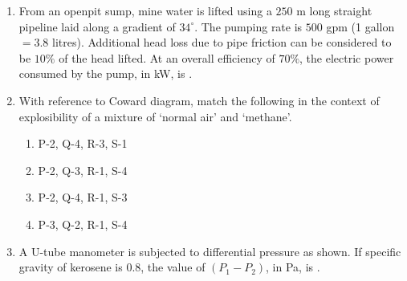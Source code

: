 \documentclass[journal]{IEEEtran}
\begin{document}
\begin{enumerate}
\item From an openpit sump, mine water is lifted using a $250$ m long straight pipeline laid along a
gradient of $34^\circ$. The pumping rate is $500$ gpm (1 gallon $= 3.8$ litres). Additional head loss due to
pipe friction can be considered to be $10\%$ of the head lifted. At an overall efficiency of $70\%$, the
electric power consumed by the pump, in kW, is \underline{\hspace{2cm}}.
\hfill{}


\item With reference to Coward diagram, match the following in the context of explosibility of a mixture of `normal air' and `methane'.

\begin{center}
\begin{minipage}{0.45\linewidth}
\centering
\renewcommand{\arraystretch}{1.2}

\end{minipage}\hfill
\begin{minipage}{0.45\linewidth}
\centering
\renewcommand{\arraystretch}{1.2}

\end{minipage}
\end{center}

\begin{enumerate}
\item P-2, Q-4, R-3, S-1
    \item P-2, Q-3, R-1, S-4
    \item P-2, Q-4, R-1, S-3
    \item P-3, Q-2, R-1, S-4
\end{enumerate}
\hfill{}

\item A U-tube manometer is subjected to differential pressure as shown. If specific gravity of kerosene is $0.8$, the value of $(P_1 - P_2)$, in Pa, is \underline{\hspace{1.5cm}}.


\end{enumerate}
\end{document}

